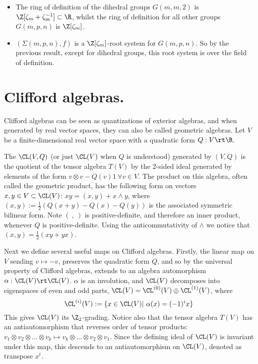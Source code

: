 \begin{theorem} \begin{itemize}
  \item The ring of definition of the dihedral groups $G(m,m,2)$ is $\Z[\zeta_m+\zeta_m^{-1}]\subset \R$, whilst the ring of definition for all other groups $G(m,p,n)$ is $\Z[\zeta_m]$.
  
    \item $(\Sigma(m,p,n),f)$ is a $\Z[\zeta_m]$-root system for $G(m,p,n)$. So by the previous result, except for dihedral groups, this root system is over the field of definition.
\end{itemize}
\end{theorem}









\section{Clifford algebras.} Clifford algebras can be seen as quantizations of exterior algebras, and when generated by real vector spaces, they can also be called geometric algebras. Let $V$ be a finite-dimensional real vector space with a quadratic form $Q:V\rt \R$.

\begin{definition}  The  $\CL(V,Q)$ (or just $\CL(V)$ when $Q$ is understood) generated by $(V,Q)$ is the quotient of the tensor algebra $T(V)$ by the 2-sided ideal generated by elements of the form $v\otimes v-Q(v)1\ \forall v\in V$. The product on this algebra, often called the geometric product, has the following  form on vectors $x,y\in V\subset \CL(V)$: $xy=(x,y)+x\wedge y$, where $(x,y):=\frac{1}{2}(Q(x+y)-Q(x)-Q(y))$ is the associated symmetric bilinear form. Note $(\ ,\ )$ is positive-definite, and therefore an inner product, whenever $Q$ is positive-definite. Using the anticommutativity of $\wedge$ we notice that $(x,y)=\frac{1}{2}(xy+yx)$.
\end{definition}

\nt Next we define several useful maps on Clifford algebras. Firstly, the linear map on $V$ sending $v\mapsto -v$, preserves the quadratic form $Q$, and so by the universal property of Clifford algebras, extends to an algebra automorphism $\alpha: \CL(V)\rt \CL(V)$. $\alpha$ is an involution, and $\CL(V)$ decomposes into eigenspaces of even and odd parts, $\CL(V)=\CL^{(0)}(V)\oplus \CL^{(1)}(V)$, where
$$\CL^{(i)}(V) :=\{x\in \CL(V)|\ \alpha(x)=(-1)^i x\}$$
This gives $\CL(V)$ its $\Z_2$-grading. Notice also that the tensor algebra $T(V)$ has an antiautomorphism that reverses order of tensor products: $v_1\otimes v_2\otimes \dots \otimes v_k \mapsto v_k\otimes\dots \otimes v_2\otimes v_1$. Since the defining ideal of $\CL(V)$ is invariant under this map, this descends to an antiautomorphism on $\CL(V)$, denoted as transpose $x^t$.

